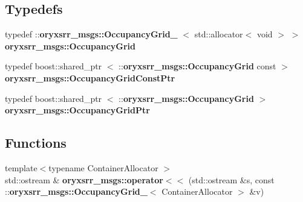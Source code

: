 \subsection*{\-Typedefs}
\begin{DoxyCompactItemize}
\item 
typedef \*
\-::{\bf oryxsrr\-\_\-msgs\-::\-Occupancy\-Grid\-\_\-}\*
$<$ std\-::allocator$<$ void $>$ $>$ {\bf oryxsrr\-\_\-msgs\-::\-Occupancy\-Grid}
\item 
typedef boost\-::shared\-\_\-ptr\*
$<$ \-::{\bf oryxsrr\-\_\-msgs\-::\-Occupancy\-Grid} \*
const  $>$ {\bf oryxsrr\-\_\-msgs\-::\-Occupancy\-Grid\-Const\-Ptr}
\item 
typedef boost\-::shared\-\_\-ptr\*
$<$ \-::{\bf oryxsrr\-\_\-msgs\-::\-Occupancy\-Grid} $>$ {\bf oryxsrr\-\_\-msgs\-::\-Occupancy\-Grid\-Ptr}
\end{DoxyCompactItemize}
\subsection*{\-Functions}
\begin{DoxyCompactItemize}
\item 
{\footnotesize template$<$typename Container\-Allocator $>$ }\\std\-::ostream \& {\bf oryxsrr\-\_\-msgs\-::operator$<$$<$} (std\-::ostream \&s, const \-::{\bf oryxsrr\-\_\-msgs\-::\-Occupancy\-Grid\-\_\-}$<$ \-Container\-Allocator $>$ \&v)
\end{DoxyCompactItemize}
